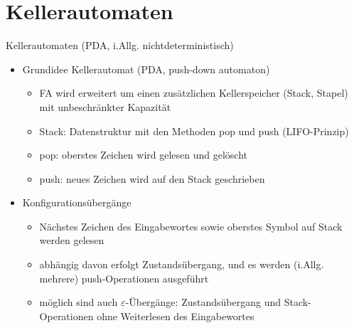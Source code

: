 \section{Kellerautomaten}

\begin{frame}{Kellerautomaten (PDA, i.Allg. nichtdeterministisch)}
	\begin{itemize}
		\item Grundidee Kellerautomat (PDA, push-down automaton)
		\begin{itemize}
			\item FA wird erweitert um einen zusätzlichen Kellerspeicher (Stack, Stapel)
			mit unbeschränkter Kapazität
			\item Stack: Datenstruktur mit den Methoden pop und push (LIFO-Prinzip)
			\item pop: oberstes Zeichen wird gelesen und gelöscht
			\item push: neues Zeichen wird auf den Stack geschrieben
		\end{itemize}
		\item Konfigurationsübergänge
		\begin{itemize}
			\item Nächstes Zeichen des Eingabewortes sowie oberstes Symbol auf Stack
			werden gelesen
			\item abhängig davon erfolgt Zustandsübergang, und es werden (i.Allg.
			mehrere) push-Operationen ausgeführt
			\item möglich sind auch $\varepsilon$-Übergänge: Zustandsübergang und Stack-
			Operationen ohne Weiterlesen des Eingabewortes
		\end{itemize}
	\end{itemize}
\end{frame}

